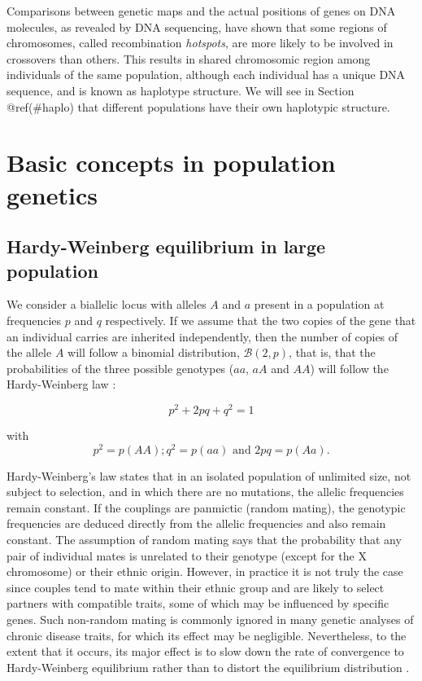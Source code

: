 \documentclass[]{book}
\begin{document}
Comparisons between genetic maps and the actual positions of genes on
DNA molecules, as revealed by DNA sequencing, have shown that some
regions of chromosomes, called recombination \emph{hotspots}, are more likely
to be involved in crossovers than others. This results in shared
chromosomic region among individuals of the same population, although
each individual has a unique DNA sequence, and is known as haplotype
structure. We will see in Section @ref(\#haplo) that different
populations have their own haplotypic structure.

\hypertarget{basic-concepts-in-population-genetics}{%
\section{Basic concepts in population genetics}\label{basic-concepts-in-population-genetics}}

\hypertarget{HWE}{%
\subsection{Hardy-Weinberg equilibrium in large population}\label{HWE}}

We consider a biallelic locus with alleles \(A\) and \(a\) present in a
population at frequencies \(p\) and \(q\) respectively. If we assume that
the two copies of the gene that an individual carries are inherited
independently, then the number of copies of the allele \(A\) will follow a
binomial distribution, \(\mathcal{B}(2,p)\), that is, that the
probabilities of the three possible genotypes (\(aa\), \(aA\) and \(AA\)) will
follow the Hardy-Weinberg law \citep{weinberg1908ber}:

\[p^2 + 2pq + q^2 = 1\]

with \[p^2 = p(AA); q^2 = p(aa) \mbox{ and } 2pq = p(Aa).\]

Hardy-Weinberg's law states that in an isolated population of unlimited
size, not subject to selection, and in which there are no mutations, the
allelic frequencies remain constant. If the couplings are panmictic
(random mating), the genotypic frequencies are deduced directly from the
allelic frequencies and also remain constant. The assumption of random
mating says that the probability that any pair of individual mates is
unrelated to their genotype (except for the X chromosome) or their
ethnic origin. However, in practice it is not truly the case since
couples tend to mate within their ethnic group and are likely to select
partners with compatible traits, some of which may be influenced by
specific genes. Such non-random mating is commonly ignored in many
genetic analyses of chronic disease traits, for which its effect may be
negligible. Nevertheless, to the extent that it occurs, its major effect
is to slow down the rate of convergence to Hardy-Weinberg equilibrium
rather than to distort the equilibrium distribution
\citep{thomas2004statistical}.
\end{document}
